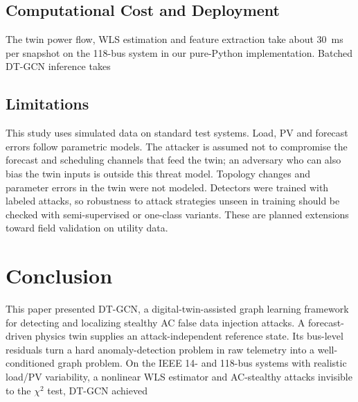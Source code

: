 \subsection{Computational Cost and Deployment}
The twin power flow, WLS estimation and feature extraction take about 30~ms per snapshot on the 118-bus system in our pure-Python implementation. Batched DT-GCN inference takes %

\subsection{Limitations}
This study uses simulated data on standard test systems. Load, PV and forecast errors follow parametric models. The attacker is assumed not to compromise the forecast and scheduling channels that feed the twin; an adversary who can also bias the twin inputs is outside this threat model. Topology changes and parameter errors in the twin were not modeled. Detectors were trained with labeled attacks, so robustness to attack strategies unseen in training should be checked with semi-supervised or one-class variants. These are planned extensions toward field validation on utility data.

\section{Conclusion}
This paper presented DT-GCN, a digital-twin-assisted graph learning framework for detecting and localizing stealthy AC false data injection attacks. A forecast-driven physics twin supplies an attack-independent reference state. Its bus-level residuals turn a hard anomaly-detection problem in raw telemetry into a well-conditioned graph problem. On the IEEE 14- and 118-bus systems with realistic load/PV variability, a nonlinear WLS estimator and AC-stealthy attacks invisible to the $\chi^2$ test, DT-GCN achieved %
